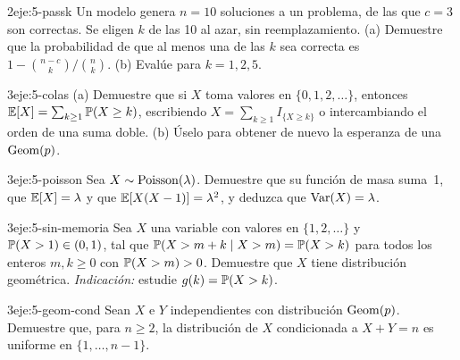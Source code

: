 \begin{ejercicio}{2}{eje:5-passk}
Un modelo genera $n=10$ soluciones a un problema, de las que $c=3$ son correctas. Se eligen $k$ de las 10 al azar, sin reemplazamiento. (a) Demuestre que la probabilidad de que al menos una de las $k$ sea correcta es $1-\binom{n-c}{k}\big/\binom{n}{k}$. (b) Evalúe para $k=1,2,5$.
\end{ejercicio}

\begin{ejercicio}{3}{eje:5-colas}
(a) Demuestre que si $X$ toma valores en $\{0,1,2,\dots\}$, entonces $\mathbb{E}[X]=\sum_{k\ge1}\mathbb{P}(X\ge k)$, escribiendo $X=\sum_{k\ge1}I_{\{X\ge k\}}$ o intercambiando el orden de una suma doble. (b) Úselo para obtener de nuevo la esperanza de una $\operatorname{Geom}(p)$.
\end{ejercicio}

\begin{ejercicio}{3}{eje:5-poisson}
Sea $X\sim\operatorname{Poisson}(\lambda)$. Demuestre que su función de masa suma~1, que $\mathbb{E}[X]=\lambda$ y que $\mathbb{E}[X(X-1)]=\lambda^{2}$, y deduzca que $\operatorname{Var}(X)=\lambda$.
\end{ejercicio}

\begin{ejercicio}{3}{eje:5-sin-memoria}
Sea $X$ una variable con valores en $\{1,2,\dots\}$ y $\mathbb{P}(X>1)\in(0,1)$, tal que $\mathbb{P}(X>m+k\mid X>m)=\mathbb{P}(X>k)$ para todos los enteros $m,k\ge0$ con $\mathbb{P}(X>m)>0$. Demuestre que $X$ tiene distribución geométrica. \emph{Indicación:} estudie $g(k)=\mathbb{P}(X>k)$.
\end{ejercicio}

\begin{ejercicio}{3}{eje:5-geom-cond}
Sean $X$ e $Y$ independientes con distribución $\operatorname{Geom}(p)$. Demuestre que, para $n\ge2$, la distribución de $X$ condicionada a $X+Y=n$ es uniforme en $\{1,\dots,n-1\}$.
\end{ejercicio}
